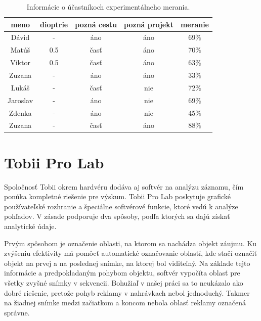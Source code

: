 \begin{table}[ht]
\centering
\begin{tabular}{ |c c c c c|  }
\hline
meno & dioptrie & pozná cestu & pozná projekt & meranie \\
\hline
Dávid & - & áno & áno & 69\% \\
Matúš & 0.5 & časť & áno & 70\% \\
Viktor & 0.5 & časť & áno & 63\% \\
Zuzana & - & áno & áno & 33\% \\
Lukáš & - & časť & nie & 72\% \\
Jaroslav & - & áno & nie & 69\% \\
Zdenka & - & áno & nie & 45\% \\
Zuzana & - & časť & áno & 88\% \\
\hline
\end{tabular}
\caption{Informácie o účastníkoch experimentálneho merania.}
\label{table:1}
\end{table}

\section{Tobii Pro Lab}

Spoločnosť Tobii okrem hardvéru dodáva aj softvér na analýzu záznamu, čím ponúka kompletné riešenie pre výskum. Tobii Pro Lab poskytuje grafické používateľské rozhranie a špeciálne softvérové funkcie, ktoré vedú k analýze pohľadov. V zásade podporuje dva spôsoby, podľa ktorých sa dajú získať analytické údaje. 

Prvým spôsobom je označenie oblasti, na ktorom sa nachádza objekt záujmu. Ku zvýšeniu efektivity má pomôcť automatické označovanie oblastí, kde stačí označiť objekt na prvej a na poslednej snímke, na ktorej bol viditeľný. Na základe tejto informácie a predpokladaným pohybom objektu, softvér vypočíta oblasť pre všetky zvyšné snímky v sekvencii. Bohužiaľ v našej práci sa to neukázalo ako dobré riešenie, pretože pohyb reklamy v nahrávkach nebol jednoduchý. Takmer na žiadnej snímke medzi začiatkom a koncom nebola oblasť reklamy označená správne. 

